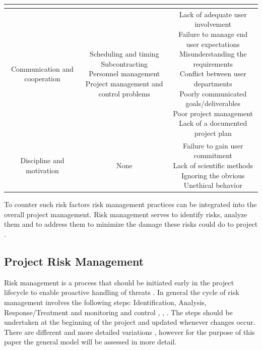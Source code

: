 \begin{table}[H]
{\begin{tabular}{c|c|c}
{		}\\  \hline
		Communication and cooperation &
		\makecell{
			Scheduling and timing\\
			Subcontracting \\
			Personnel management\\
			Project management and control problems\\
		}&
		\makecell{
			Lack of adequate user involvement\\
			Failure to manage end user expectations\\
			Misunderstanding the requirements\\
			Conflict between user departments\\
			Poorly communicated goals/deliverables\\
			Poor project management\\
			Lack of a documented project plan\\
		} \\ \hline
		Discipline and motivation &
		\makecell{
			None\\
		}&
		\makecell{
			Failure to gain user commitment\\
			Lack of scientific methods\\
			Ignoring the obvious\\
			Unethical behavior\\
		} \\ \hline
	\end{tabular}}
	\label{tab:riskfactorscategorization}
\end{table}
To counter such risk factors risk management practices can be integrated into the overall project management. Risk management serves to identify risks, analyze them and to address them to minimize the damage these risks could do to project \cite{teschITProjectRisk2007}.

\subsection{Project Risk Management}
\label{sec:theoryAc}
Risk management is a process that should be initiated early in the project lifecycle to enable proactive handling of threats \cite{islamSoftwareDevelopmentRisk2011}. In general the cycle of risk management involves the following steps: Identification, Analysis, Response/Treatment and monitoring and control \cite{islamSoftwareDevelopmentRisk2011}, \cite{teschITProjectRisk2007}, \cite{didragaRoleEffectsRisk2013}. The steps should be undertaken at the beginning of the project and updated whenever changes occur. There are different and more detailed variations \cite{teschITProjectRisk2007}, however for the purpose of this paper the general model will be assessed in more detail.

